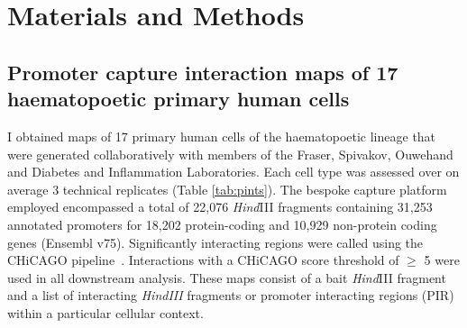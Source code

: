 \documentclass[a4paper,11pt]{report}
\begin{document}





\chapter{Materials and Methods}

\section{Promoter capture interaction maps of 17 haematopoetic primary human cells}
I obtained maps of 17 primary human cells of the haematopoetic lineage that were generated collaboratively with members of the Fraser, Spivakov, Ouwehand and Diabetes and Inflammation Laboratories. Each cell type was assessed over on average 3 technical replicates (Table \ref{tab:pints}). The bespoke capture platform employed encompassed a total of 22,076 \textit{Hind}III fragments containing 31,253 annotated promoters for 18,202 protein-coding and 10,929 non-protein coding genes (Ensembl v75). Significantly interacting regions were called using the CHiCAGO pipeline~\citep{CairnsFreire-PritchettWingettEtAl2016}. Interactions with a CHiCAGO score threshold of $\geqslant$ 5 were used in all downstream analysis. These maps consist of a bait \textit{Hind}III fragment and a list of interacting \textit{HindIII} fragments or promoter interacting regions (PIR) within a particular cellular context.
\end{document}
